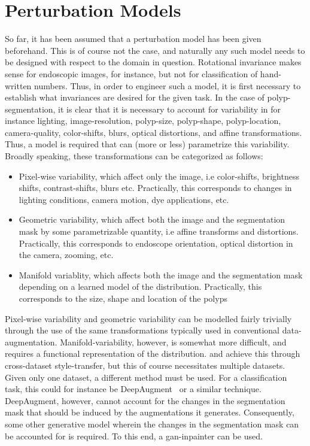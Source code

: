 \section{Perturbation Models}
So far, it has been assumed that a perturbation model has been given beforehand. This is of course not the case, and naturally any such model needs to be designed with respect to the domain in question. Rotational invariance makes sense for endoscopic images, for instance, but not for classification of hand-written numbers. Thus, in order to engineer such a model, it is first necessary to establish what invariances are desired for the given task. In the case of polyp-segmentation, it is clear that it is necessary to account for variability in for instance lighting, image-resolution, polyp-size, polyp-shape, polyp-location, camera-quality, color-shifts, blurs, optical distortions, and affine transformations. Thus, a model is required that can (more or less) parametrize this variability. Broadly speaking, these transformations can be categorized as follows:
\begin{itemize}
    \item Pixel-wise variability, which affect only the image, i.e color-shifts, brightness shifts, contrast-shifts,  blurs etc. Practically, this corresponds to changes in lighting conditions, camera motion, dye applications, etc.
    \item Geometric variability, which affect both the image and the segmentation mask by some parametrizable quantity, i.e affine transforms and distortions. Practically, this corresponds to endoscope orientation, optical distortion in the camera, zooming, etc. 
    \item Manifold variablity, which affects both the image and the segmentation mask depending on a learned model of the distribution. Practically, this corresponds to the size, shape and location of the polyps
\end{itemize}
Pixel-wise variability and geometric variability can be modelled fairly trivially through the use of the same transformations typically used in conventional data-augmentation. Manifold-variability, however, is somewhat more difficult, and requires a functional representation of the distribution. \cite{modelbased} and \cite{cyclegan} achieve this through cross-dataset style-transfer, but this of course necessitates multiple datasets. Given only one dataset, a different method must be used. For a classification task, this could for instance be DeepAugment~\cite{deepaugment} or a similar technique. DeepAugment, however, cannot account for the changes in the segmentation mask that should be induced by the augmentations it generates. Consequently, some other generative model wherein the changes in the segmentation mask can be accounted for is required. To this end, a \gls{gan}-inpainter can be used. 

